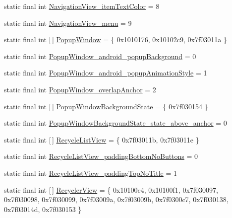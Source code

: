 \begin{DoxyCompactItemize}
\item 
static final int \mbox{\hyperlink{classandroid_1_1support_1_1design_1_1_r_1_1styleable_a4c70373033dbbc3f671832143e22c0b0}{Navigation\+View\+\_\+item\+Text\+Color}} = 8
\item 
static final int \mbox{\hyperlink{classandroid_1_1support_1_1design_1_1_r_1_1styleable_a028c10ccff368a73e6280a6f7ff22053}{Navigation\+View\+\_\+menu}} = 9
\item 
static final int \mbox{[}$\,$\mbox{]} \mbox{\hyperlink{classandroid_1_1support_1_1design_1_1_r_1_1styleable_aa75bc963c35e5bb705cefe081e851f59}{Popup\+Window}} = \{ 0x1010176, 0x10102c9, 0x7f03011a \}
\item 
static final int \mbox{\hyperlink{classandroid_1_1support_1_1design_1_1_r_1_1styleable_ad6a7bb695118202b71eb597719a36bd2}{Popup\+Window\+\_\+android\+\_\+popup\+Background}} = 0
\item 
static final int \mbox{\hyperlink{classandroid_1_1support_1_1design_1_1_r_1_1styleable_a07d7a32addec590fa21453ee5369adcc}{Popup\+Window\+\_\+android\+\_\+popup\+Animation\+Style}} = 1
\item 
static final int \mbox{\hyperlink{classandroid_1_1support_1_1design_1_1_r_1_1styleable_afe1e929b18fc439ef8499d628296a0e3}{Popup\+Window\+\_\+overlap\+Anchor}} = 2
\item 
static final int \mbox{[}$\,$\mbox{]} \mbox{\hyperlink{classandroid_1_1support_1_1design_1_1_r_1_1styleable_a0fa0763898706ab0c593a428f940c3e1}{Popup\+Window\+Background\+State}} = \{ 0x7f030154 \}
\item 
static final int \mbox{\hyperlink{classandroid_1_1support_1_1design_1_1_r_1_1styleable_a9653139b89d50df3ffe6fe98aef4c6c2}{Popup\+Window\+Background\+State\+\_\+state\+\_\+above\+\_\+anchor}} = 0
\item 
static final int \mbox{[}$\,$\mbox{]} \mbox{\hyperlink{classandroid_1_1support_1_1design_1_1_r_1_1styleable_a3c29f583649e45ac1f85ab5775cd480d}{Recycle\+List\+View}} = \{ 0x7f03011b, 0x7f03011e \}
\item 
static final int \mbox{\hyperlink{classandroid_1_1support_1_1design_1_1_r_1_1styleable_aa4906eeb497fcc32fc46af5a93850ea6}{Recycle\+List\+View\+\_\+padding\+Bottom\+No\+Buttons}} = 0
\item 
static final int \mbox{\hyperlink{classandroid_1_1support_1_1design_1_1_r_1_1styleable_a2a7057fc4a02aacc39f806ea8844e76a}{Recycle\+List\+View\+\_\+padding\+Top\+No\+Title}} = 1
\item 
static final int \mbox{[}$\,$\mbox{]} \mbox{\hyperlink{classandroid_1_1support_1_1design_1_1_r_1_1styleable_a1700d79470c52662f934bd53b1a05a14}{Recycler\+View}} = \{ 0x10100c4, 0x10100f1, 0x7f030097, 0x7f030098, 0x7f030099, 0x7f03009a, 0x7f03009b, 0x7f0300c7, 0x7f030138, 0x7f03014d, 0x7f030153 \}

\end{DoxyCompactItemize}
